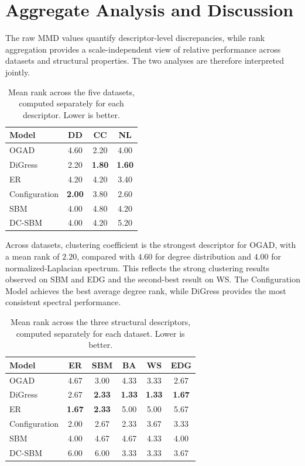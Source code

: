\section{Aggregate Analysis and Discussion}
\label{sec:exp_rank_analysis}

The raw MMD values quantify descriptor-level discrepancies, while rank aggregation provides a scale-independent view of relative performance across datasets and structural properties.
The two analyses are therefore interpreted jointly.

\begin{table}[htbp]
    \centering
    \caption{Mean rank across the five datasets, computed separately for each descriptor. Lower is better.}
    \label{tab:exp_rank_metric}
    \begin{tabular}{lccc}
        \hline
        Model & DD & CC & NL \\
        \hline
        OGAD          & 4.60 & 2.20 & 4.00 \\
        DiGress       & 2.20 & \textbf{1.80} & \textbf{1.60} \\
        ER            & 4.20 & 4.20 & 3.40 \\
        Configuration & \textbf{2.00} & 3.80 & 2.60 \\
        SBM           & 4.00 & 4.80 & 4.20 \\
        DC-SBM        & 4.00 & 4.20 & 5.20 \\
        \hline
    \end{tabular}
\end{table}

Across datasets, clustering coefficient is the strongest descriptor for OGAD, with a mean rank of \(2.20\), compared with \(4.60\) for degree distribution and \(4.00\) for normalized-Laplacian spectrum.
This reflects the strong clustering results observed on SBM and EDG and the second-best result on WS.
The Configuration Model achieves the best average degree rank, while DiGress provides the most consistent spectral performance.

\begin{table}[htbp]
    \centering
    \caption{Mean rank across the three structural descriptors, computed separately for each dataset. Lower is better.}
    \label{tab:exp_rank_dataset}
    \begin{tabular}{lccccc}
        \hline
        Model & ER & SBM & BA & WS & EDG \\
        \hline
        OGAD          & 4.67 & 3.00 & 4.33 & 3.33 & 2.67 \\
        DiGress       & 2.67 & \textbf{2.33} & \textbf{1.33} & \textbf{1.33} & \textbf{1.67} \\
        ER            & \textbf{1.67} & \textbf{2.33} & 5.00 & 5.00 & 5.67 \\
        Configuration & 2.00 & 2.67 & 2.33 & 3.67 & 3.33 \\
        SBM           & 4.00 & 4.67 & 4.67 & 4.33 & 4.00 \\
        DC-SBM        & 6.00 & 6.00 & 3.33 & 3.33 & 3.67 \\
        \hline
    \end{tabular}
\end{table}

